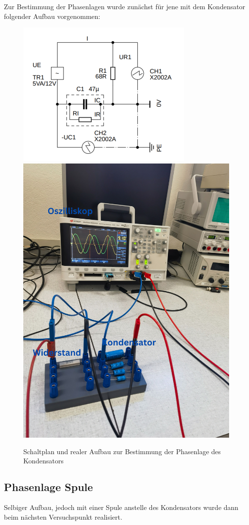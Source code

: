 \documentclass[12pt,a4paper,twoside]{article}
\begin{document}
Zur Bestimmung der Phasenlagen wurde zunächst für jene mit dem Kondensator folgender Aufbau vorgenommen:

\begin{figure}[H]
    \centering
    \includegraphics[width=0.4\linewidth]{nudes/Schaltplan3.PNG}
    \includegraphics[width=0.4\linewidth]{nudes/PhaseLeistungBilder/Aufbau3.jpg}
    \caption{Schaltplan und realer Aufbau zur Bestimmung der Phasenlage des Kondensators}
    \label{fig:Aufbau3}
\end{figure}

\subsection{Phasenlage Spule}

Selbiger Aufbau, jedoch mit einer Spule anstelle des Kondensators wurde dann beim nächsten Versuchspunkt realisiert.
\end{document}
